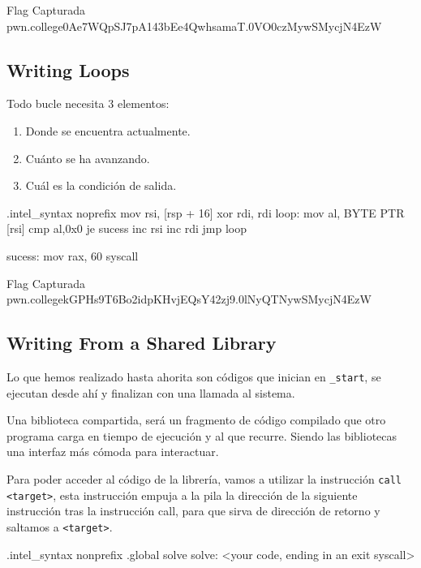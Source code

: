 \begin{flagbox}{Flag Capturada}
	pwn.college{0Ae7WQpSJ7pA143bEe4QwhsamaT.0VO0czMywSMycjN4EzW}
\end{flagbox}

\subsection{Writing Loops} \label{subsec:writing_loops}

Todo bucle necesita 3 elementos:

\begin{enumerate}
	\item Donde se encuentra actualmente.
	\item Cuánto se ha avanzando.
	\item Cuál es la condición de salida.
\end{enumerate}
\begin{codebox}[ASM]{}
	.intel_syntax noprefix
	mov rsi, [rsp + 16]
	xor rdi, rdi
	loop:
	mov al, BYTE PTR [rsi]
	cmp al,0x0
	je sucess
	inc rsi
	inc rdi
	jmp loop

	sucess:
	mov rax, 60
	syscall
\end{codebox}

\begin{flagbox}{Flag Capturada}
	pwn.college{kGPHs9T6Bo2idpKHvjEQsY42zj9.0lNyQTNywSMycjN4EzW}
\end{flagbox}

\subsection{Writing From a Shared Library} \label{subsec:writing_from_a_shared_library}

Lo que hemos realizado hasta ahorita son códigos que inician en
\texttt{_start}, se ejecutan desde ahí y finalizan con una llamada al
sistema.

Una biblioteca compartida, será un fragmento de código compilado que otro programa
carga en tiempo de ejecución y al que recurre. Siendo las bibliotecas una interfaz
más cómoda para interactuar.

Para poder acceder al código de la librería, vamos a utilizar la instrucción
\texttt{call <target>}, esta instrucción empuja a la pila la dirección de la
siguiente instrucción tras la instrucción call, para que sirva de dirección de retorno
y saltamos a \texttt{<target>}.

\begin{codebox}[ASM]{}
	.intel_syntax nonprefix
	.global solve
	solve:
	<your code, ending in an exit syscall>
\end{codebox}

